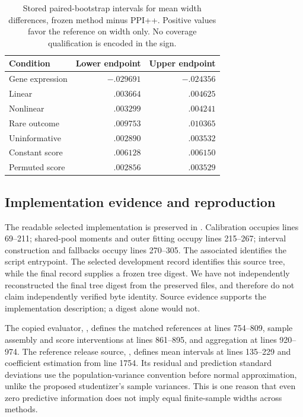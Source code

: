 \documentclass{article}
\begin{document}
\begin{table}[h]
\centering
\caption{Stored paired-bootstrap intervals for mean width differences, frozen method minus PPI++. Positive values favor the reference on width only. No coverage qualification is encoded in the sign.}
\label{tab:diff}
\begin{tabular}{lrr}
\toprule
Condition & Lower endpoint & Upper endpoint\\
\midrule
Gene expression & $-.029691$ & $-.024356$\\
Linear & $.003664$ & $.004625$\\
Nonlinear & $.003299$ & $.004241$\\
Rare outcome & $.009753$ & $.010365$\\
Uninformative & $.002890$ & $.003532$\\
Constant score & $.006128$ & $.006150$\\
Permuted score & $.002856$ & $.003529$\\
\bottomrule
\end{tabular}
\end{table}

\subsection{Implementation evidence and reproduction}
The readable selected implementation is preserved in . Calibration occupies lines 69--211; shared-pool moments and outer fitting occupy lines 215--267; interval construction and fallbacks occupy lines 270--305. The associated  identifies the script entrypoint. The selected development record identifies this source tree, while the final record supplies a frozen tree digest. We have not independently reconstructed the final tree digest from the preserved files, and therefore do not claim independently verified byte identity. Source evidence supports the implementation description; a digest alone would not.

The copied evaluator, , defines the matched references at lines 754--809, sample assembly and score interventions at lines 861--895, and aggregation at lines 920--974. The reference release source, , defines mean intervals at lines 135--229 and coefficient estimation from line 1754. Its residual and prediction standard deviations use the population-variance convention before normal approximation, unlike the proposed studentizer's sample variances. This is one reason that even zero predictive information does not imply equal finite-sample widths across methods.
\end{document}

